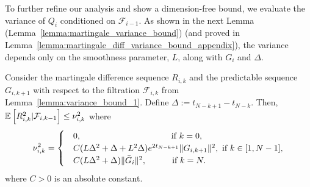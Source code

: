 

To further refine our analysis and show a dimension-free bound, we evaluate the variance of $Q_{i}$ conditioned on $\mathcal{F}_{i-1}$. As shown in the next Lemma (Lemma~\ref{lemma:martingale_variance_bound}) (and proved in Lemma~\ref{lemma:martingale_diff_variance_bound_appendix}), the variance depends only on the smoothness parameter, $L$, along with $G_i$ and $\Delta$. 

\begin{lemma}\label{lemma:martingale_variance_bound}
Consider the martingale difference sequence \(R_{i,k}\) and the predictable sequence \(G_{i,k+1}\) with respect to the filtration \(\mathcal{F}_{i,k}\) from Lemma~\ref{lemma:variance_bound_1}. Define \(\Delta := t_{N-k+1} - t_{N-k}\). Then, $\mathbb{E}\left[R_{i,k}^{2}|\mathcal{F}_{i,k-1}\right] \leq \nu_{i,k}^{2}$
where
\begin{equation}
    \nu_{i,k}^{2} =
    \begin{cases} 
        &0, \quad\quad\quad\quad\quad\quad\quad\quad\quad\;\;\quad \text{if } k = 0, \\
        &C(L\Delta^2 + \Delta + L^2\Delta) e^{2t_{N-k+1}} \|G_{i,k+1}\|^2, 
        \text{ if } k \in [1, N-1], \\
        &C(L\Delta^2 + \Delta) \|\bar{G}_i\|^2, 
        \quad\quad\quad \text{if } k = N.
    \end{cases}\notag
\end{equation}
where \( C > 0 \) is an absolute constant.
\end{lemma}


